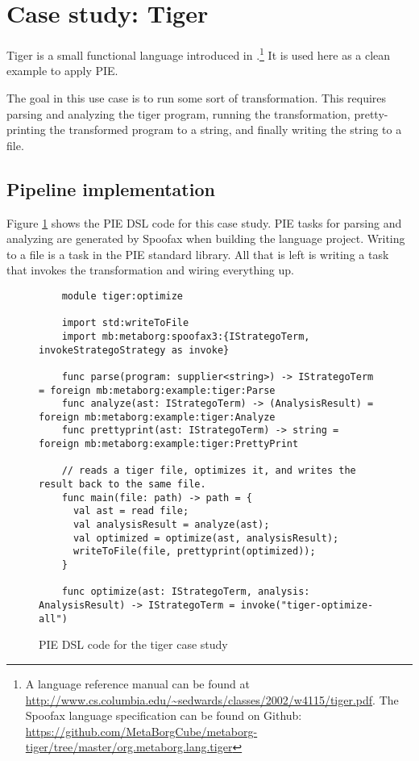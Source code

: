 \section{Case study: Tiger}
\label{sec:evaluation__tiger}

Tiger is a small functional language introduced in \textcite{Appel1998}.\footnote{A language reference manual can be found at \url{http://www.cs.columbia.edu/~sedwards/classes/2002/w4115/tiger.pdf}. The Spoofax language specification can be found on Github: \url{https://github.com/MetaBorgCube/metaborg-tiger/tree/master/org.metaborg.lang.tiger}}
It is used here as a clean example to apply \ac{PIE}.

The goal in this use case is to run some sort of transformation.
This requires parsing and analyzing the tiger program, running the transformation, pretty-printing the transformed program to a string, and finally writing the string to a file.

\subsection{Pipeline implementation}
\label{subsec:evaluation__tiger__implementation}

Figure \ref{lst:case_study_tiger_pie} shows the \ac{PIE} \ac{DSL} code for this case study.
\Ac{PIE} tasks for parsing and analyzing are generated by Spoofax when building the language project.
Writing to a file is a task in the \ac{PIE} standard library.
All that is left is writing a task that invokes the transformation and wiring everything up.

\begin{figure}
  \caption{\Ac{PIE} \ac{DSL} code for the tiger case study}
  \label{lst:case_study_tiger_pie}
  \begin{lstlisting}
    module tiger:optimize

    import std:writeToFile
    import mb:metaborg:spoofax3:{IStrategoTerm, invokeStrategoStrategy as invoke}

    func parse(program: supplier<string>) -> IStrategoTerm = foreign mb:metaborg:example:tiger:Parse
    func analyze(ast: IStrategoTerm) -> (AnalysisResult) = foreign mb:metaborg:example:tiger:Analyze
    func prettyprint(ast: IStrategoTerm) -> string = foreign mb:metaborg:example:tiger:PrettyPrint

    // reads a tiger file, optimizes it, and writes the result back to the same file.
    func main(file: path) -> path = {
      val ast = read file;
      val analysisResult = analyze(ast);
      val optimized = optimize(ast, analysisResult);
      writeToFile(file, prettyprint(optimized));
    }

    func optimize(ast: IStrategoTerm, analysis: AnalysisResult) -> IStrategoTerm = invoke("tiger-optimize-all")
  \end{lstlisting}
\end{figure}


